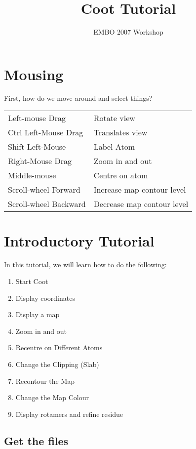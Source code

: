 \documentclass{article}
\title{Coot Tutorial}
\author{EMBO 2007 Workshop}
\begin{document}
\maketitle
\tableofcontents


\newpage

\section{Mousing}

First, how do we move around and select things?

\vspace{0.5cm}
  \begin{tabular}{ll}
    Left-mouse Drag & Rotate view \\
    Ctrl Left-Mouse Drag &  Translates view \\
    Shift Left-Mouse &  Label Atom\\
    Right-Mouse Drag &  Zoom in and out\index{zoom}\\
    Middle-mouse & Centre on atom\\
    Scroll-wheel Forward &  Increase map contour level\\
    Scroll-wheel Backward &  Decrease map contour level
  \end{tabular}
\vspace{0.5cm}

\section{Introductory Tutorial}

In this tutorial, we will learn how to do the following:
\begin{enumerate}
\item Start Coot
\item Display coordinates
\item Display a map
\item Zoom in and out
\item Recentre on Different Atoms
\item Change the Clipping (Slab)
\item Recontour the Map
\item Change the Map Colour
\item Display rotamers and refine residue
\end{enumerate}

\subsection{Get the files}
\end{document}
